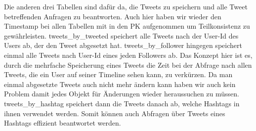 Die anderen drei Tabellen sind dafür da, die Tweets zu speichern und alle Tweet betreffenden Anfragen zu beantworten. Auch hier haben wir wieder den Timestamp bei allen Tabellen mit in den PK aufgenommen um Teilkonsistenz zu gewährleisten. tweets\_by\_tweeted speichert alle Tweets nach der User-Id des Users ab, der den Tweet abgesetzt hat. tweets\_by\_follower hingegen speichert einmal alle Tweets nach User-Id eines jeden Followers ab. Das Konzept hier ist es, durch die mehrfache Speicherung eines Tweets die Zeit bei der Abfrage nach allen Tweets, die ein User auf seiner Timeline sehen kann, zu verkürzen. Da man einmal abgesetzte Tweets auch nicht mehr ändern kann haben wir auch kein Problem damit jedes Objekt für Änderungen wieder heraussuchen zu müssen. tweets\_by\_hashtag speichert dann die Tweets danach ab, welche Hashtags in ihnen verwendet werden. Somit können auch Abfragen über Tweets eines Hashtags effizient beantwortet werden.

